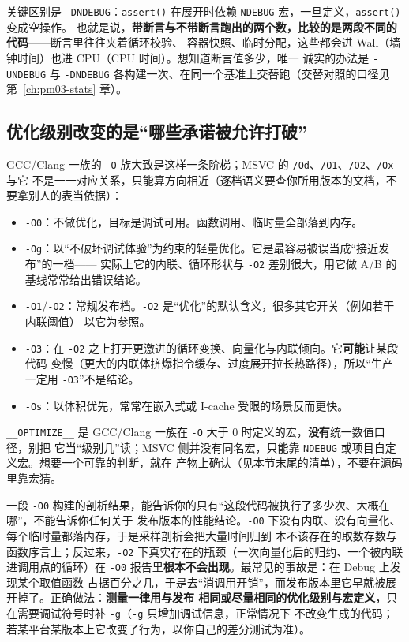 \documentclass[12pt,a4paper,fontset=fandol]{ctexbook}
\newcommand{\Fn}[1]{\texttt{#1()}}
\newcommand{\Tp}[1]{\texttt{#1}}
\newcommand{\Lang}[1]{\textsf{#1}}
\newcommand{\MWall}{\Lang{Wall}}
\newcommand{\MCpu}{\Lang{CPU}}
\begin{document}
关键区别是 \Tp{-DNDEBUG}：\Fn{assert} 在展开时依赖 \Tp{NDEBUG} 宏，一旦定义，\Fn{assert} 变成空操作。
也就是说，\textbf{带断言与不带断言跑出的两个数，比较的是两段不同的代码}——断言里往往夹着循环校验、
容器快照、临时分配，这些都会进 \MWall{}（墙钟时间）也进 \MCpu{}（CPU 时间）。想知道断言值多少，唯一
诚实的办法是 \Tp{-UNDEBUG} 与 \Tp{-DNDEBUG} 各构建一次、在同一个基准上交替跑（交替对照的口径见
第~\ref{ch:pm03-stats} 章）。

\subsection{优化级别改变的是``哪些承诺被允许打破''}

GCC/Clang 一族的 \Tp{-O} 族大致是这样一条阶梯；MSVC 的 \Tp{/Od}、\Tp{/O1}、\Tp{/O2}、\Tp{/Ox} 与它
不是一一对应关系，只能算方向相近（逐档语义要查你所用版本的文档，不要拿别人的表当依据）：

\begin{itemize}
  \item \Tp{-O0}：不做优化，目标是调试可用。函数调用、临时量全部落到内存。
  \item \Tp{-Og}：以``不破坏调试体验''为约束的轻量优化。它是最容易被误当成``接近发布''的一档——
        实际上它的内联、循环形状与 \Tp{-O2} 差别很大，用它做 A/B 的基线常常给出错误结论。
  \item \Tp{-O1}/\Tp{-O2}：常规发布档。\Tp{-O2} 是``优化''的默认含义，很多其它开关（例如若干内联阈值）
        以它为参照。
  \item \Tp{-O3}：在 \Tp{-O2} 之上打开更激进的循环变换、向量化与内联倾向。它\textbf{可能}让某段代码
        变慢（更大的内联体挤爆指令缓存、过度展开拉长热路径），所以``生产一定用 \Tp{-O3}''不是结论。
  \item \Tp{-Os}：以体积优先，常常在嵌入式或 I-cache 受限的场景反而更快。
\end{itemize}

\Tp{\_\_OPTIMIZE\_\_} 是 GCC/Clang 一族在 \Tp{-O} 大于 0 时定义的宏，\textbf{没有}统一数值口径，别把
它当``级别几''读；MSVC 侧并没有同名宏，只能靠 \Tp{NDEBUG} 或项目自定义宏。想要一个可靠的判断，就在
产物上确认（见本节末尾的清单），不要在源码里靠宏猜。

\begin{warning}[title={在 Debug 上测出来的数字什么也说明不了}]
一段 \Tp{-O0} 构建的剖析结果，能告诉你的只有``这段代码被执行了多少次、大概在哪''，不能告诉你任何关于
发布版本的性能结论。\Tp{-O0} 下没有内联、没有向量化、每个临时量都落内存，于是采样剖析会把大量时间归到
本不该存在的取数存数与函数序言上；反过来，\Tp{-O2} 下真实存在的瓶颈（一次向量化后的归约、一个被内联
进调用点的循环）在 \Tp{-O0} 报告里\textbf{根本不会出现}。最常见的事故是：在 Debug 上发现某个取值函数
占据百分之几，于是去``消调用开销''，而发布版本里它早就被展开掉了。正确做法：\textbf{测量一律用与发布
相同或尽量相同的优化级别与宏定义}，只在需要调试符号时补 \Tp{-g}（\Tp{-g} 只增加调试信息，正常情况下
不改变生成的代码；若某平台某版本上它改变了行为，以你自己的差分测试为准）。
\end{warning}
\end{document}
